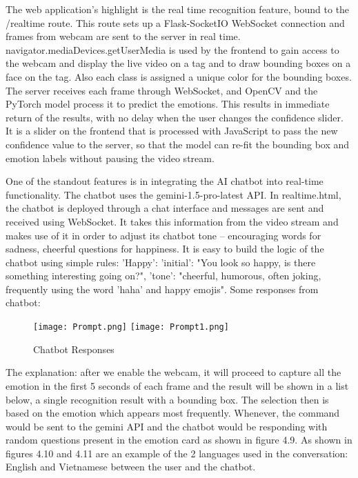 \documentclass[a4paper,13pt]{report}
\begin{document}
The web application’s highlight is the real time recognition feature, bound to the /realtime route. This route sets up a Flask-SocketIO WebSocket connection and frames from webcam are sent to the server in real time. navigator.mediaDevices.getUserMedia is used by the frontend to gain access to the webcam and display the live video on a tag and to draw bounding boxes on a face on the tag. Also each class is assigned a unique color for the bounding boxes. The server receives each frame through WebSocket, and OpenCV and the PyTorch model process it to predict the emotions. This results in immediate return of the results, with no delay when the user changes the confidence slider. It is a slider on the frontend that is processed with JavaScript to pass the new confidence value to the server, so that the model can re-fit the bounding box and emotion labels without pausing the video stream.


One of the standout features is in integrating the AI chatbot into real-time functionality. The chatbot uses the gemini-1.5-pro-latest API. In realtime.html, the chatbot is deployed through a chat interface and messages are sent and received using WebSocket. It takes this information from the video stream and makes use of it in order to adjust its chatbot tone – encouraging words for sadness, cheerful questions for happiness. It is easy to build the logic of the chatbot using simple rules:
 'Happy': {
       	 'initial': "You look so happy, is there something interesting going on?",
  	 'tone': "cheerful, humorous, often joking, frequently using the word 'haha' and happy emojis"}. Some responses from chatbot:

\begin{figure}[H]
  \centering
  \texttt{[image: Prompt.png]}
    \texttt{[image: Prompt1.png]}
  \caption{Chatbot Responses}
  \label{fig:method}
\end{figure}

The explanation: after we enable the webcam, it will proceed to capture all the emotion in the first 5 seconds of each frame and the result will be shown in a list below, a single recognition result with a bounding box. The selection then is based on the emotion which appears most frequently. Whenever, the command would be sent to the gemini API and the chatbot would be responding with random questions present in the emotion card as shown in figure 4.9. As shown in figures 4.10 and 4.11 are an example of the 2 languages used in the conversation: English and Vietnamese between the user and the chatbot.
\end{document}
